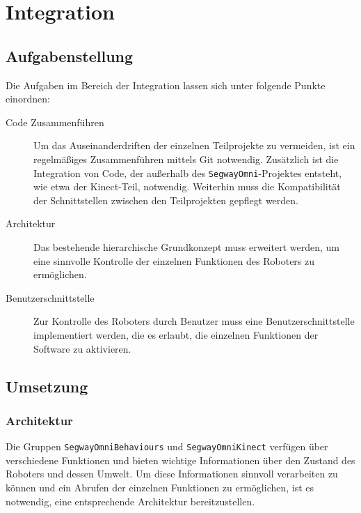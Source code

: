 
\chapter{Integration}
\label{integration_cha}
\authorsection{\editorjulian}

\section{Aufgabenstellung}
\label{aufgabenstellung_integration_sec}

Die Aufgaben im Bereich der Integration lassen sich unter folgende Punkte einordnen:

\begin{description}
\item[Code Zusammenführen]
Um das Auseinanderdriften der einzelnen Teilprojekte zu vermeiden, ist ein regelmäßiges Zusammenführen 
mittels Git notwendig. Zusätzlich ist die Integration von Code, der außerhalb des \lstinline{SegwayOmni}-Projektes 
entsteht, wie etwa der Kinect-Teil, notwendig. Weiterhin muss die Kompatibilität der Schnittstellen 
zwischen den Teilprojekten gepflegt werden.

\item[Architektur]
Das bestehende hierarchische Grundkonzept muss erweitert werden, um eine sinnvolle Kontrolle der 
einzelnen Funktionen des Roboters zu ermöglichen.

\item[Benutzerschnittstelle]
Zur Kontrolle des Roboters durch Benutzer muss eine Benutzerschnittstelle implementiert werden, die es 
erlaubt, die einzelnen Funktionen der Software zu aktivieren.

\end{description}

\section{Umsetzung}
\label{umsetzung_integration_sec}

\subsection{Architektur}
\label{integration_architektur_sec}

Die Gruppen \lstinline{SegwayOmniBehaviours} und \lstinline{SegwayOmniKinect} verfügen über 
verschiedene Funktionen und bieten wichtige Informationen über den Zustand des Roboters und 
dessen Umwelt. Um diese Informationen sinnvoll verarbeiten zu können und ein Abrufen der einzelnen 
Funktionen zu ermöglichen, ist es notwendig, eine entsprechende Architektur bereitzustellen.

